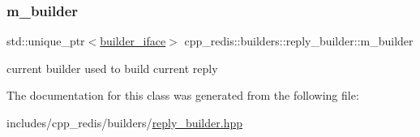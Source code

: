 \subsubsection{\texorpdfstring{m\+\_\+builder}{m\_builder}}
{\footnotesize\ttfamily std\+::unique\+\_\+ptr$<$\hyperlink{classcpp__redis_1_1builders_1_1builder__iface}{builder\+\_\+iface}$>$ cpp\+\_\+redis\+::builders\+::reply\+\_\+builder\+::m\+\_\+builder\hspace{0.3cm}{\ttfamily [private]}}

current builder used to build current reply 

The documentation for this class was generated from the following file\+:\begin{DoxyCompactItemize}
\item 
includes/cpp\+\_\+redis/builders/\hyperlink{reply__builder_8hpp}{reply\+\_\+builder.\+hpp}\end{DoxyCompactItemize}
